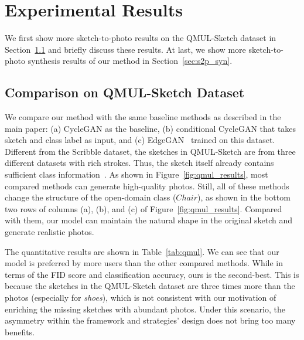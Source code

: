 \documentclass[10pt,twocolumn,letterpaper]{article}
\begin{document}
\section{Experimental Results}
\label{sec:exp_res}
We first show more sketch-to-photo results on the QMUL-Sketch dataset in Section~\ref{sec:qmul} and briefly discuss these results. At last, we show more sketch-to-photo synthesis results of our method in Section~\ref{sec:s2p_syn}. 

\subsection{Comparison on QMUL-Sketch Dataset}
\label{sec:qmul}
 We compare our method with the same baseline methods as described in the main paper: (a) CycleGAN as the baseline, (b) conditional CycleGAN that takes sketch and class label as input, and (c) EdgeGAN~\cite{gao2020sketchycoco} trained on this dataset. Different from the Scribble dataset, the sketches in QMUL-Sketch are from three different datasets with rich strokes. Thus, the sketch itself already contains sufficient class information~\cite{liu2019unpaired}. As shown in Figure~\ref{fig:qmul_results}, most compared methods can generate high-quality photos. Still, all of these methods change the structure of the open-domain class ($Chair$), as shown in the bottom two rows of columns (a), (b), and (c) of Figure~\ref{fig:qmul_results}. Compared with them, our model can maintain the natural shape in the original sketch and generate realistic photos.

The quantitative results are shown in Table~\ref{tab:qmul}. We can see that our model is preferred by more users than the other compared methods. While in terms of the FID score and classification accuracy, ours is the second-best. This is because the sketches in the QMUL-Sketch dataset are three times more than the photos (especially for \textit{shoes}), which is not consistent with our motivation of enriching the missing sketches with abundant photos. Under this scenario, the asymmetry within the framework and strategies' design does not bring too many benefits. 
\end{document}
